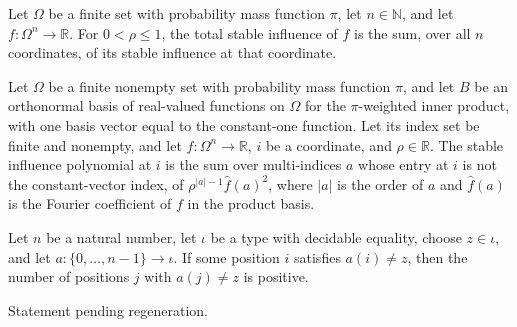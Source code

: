 \begin{definition}
\label{FABL.productTotalStableInfluence}
\leanok
{}
Let $\Omega$ be a finite set with probability mass function $\pi$, let $n\in\mathbb{N}$,
and let $f\colon\Omega^n\to\mathbb{R}$. For $0<\rho\leq1$, the total stable influence of
$f$ is the sum, over all $n$ coordinates, of its stable influence at that coordinate.
\end{definition}

\begin{definition}
\label{FABL.stableInfluencePolynomial}
\leanok
{}
Let $\Omega$ be a finite nonempty set with probability mass function $\pi$, and let $B$
be an orthonormal basis of real-valued functions on $\Omega$ for the $\pi$-weighted
inner product, with one basis vector equal to the constant-one function. Let its index
set be finite and nonempty, and let $f\colon\Omega^n\to\mathbb{R}$, $i$ be a coordinate,
and $\rho\in\mathbb{R}$. The stable influence polynomial at $i$ is the sum over
multi-indices $a$ whose entry at $i$ is not the constant-vector index, of
$\rho^{|a|-1}\widehat f(a)^2$, where $|a|$ is the order of $a$ and $\widehat f(a)$ is
the Fourier coefficient of $f$ in the product basis.
\end{definition}

\begin{theorem}
\label{FABL.multiIndexOrder_pos_of_ne}
\leanok
{}
Let $n$ be a natural number, let $\iota$ be a type with decidable equality, choose
$z\in\iota$, and let $a:\{0,\ldots,n-1\}\to\iota$. If some position $i$ satisfies
$a(i)\ne z$, then the number of positions $j$ with $a(j)\ne z$ is positive.
\end{theorem}

\begin{theorem}
\label{FABL.FiniteFourierBasis.productStableInfluence_eq_polynomial}
\leanok
{}
Statement pending regeneration.
\end{theorem}

